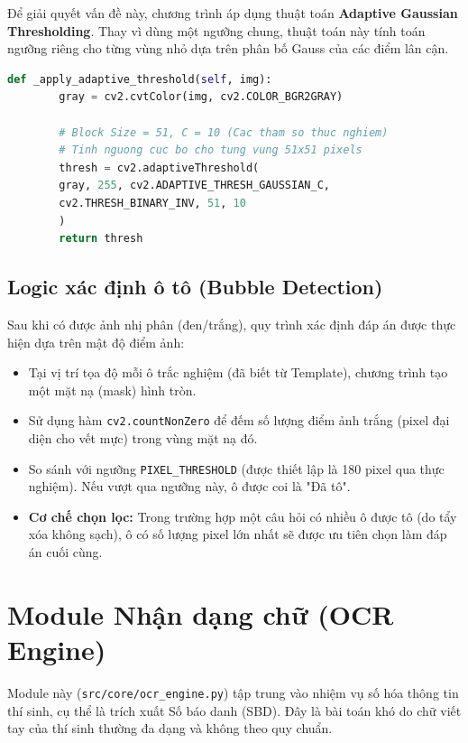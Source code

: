 \documentclass[6pt, a4paper]{report}
\begin{document}
	Để giải quyết vấn đề này, chương trình áp dụng thuật toán \textbf{Adaptive Gaussian Thresholding}. Thay vì dùng một ngưỡng chung, thuật toán này tính toán ngưỡng riêng cho từng vùng nhỏ dựa trên phân bố Gauss của các điểm lân cận.
	
	\begin{lstlisting}[language=Python, caption={Cài đặt thuật toán Adaptive Thresholding}]
		def _apply_adaptive_threshold(self, img):
		gray = cv2.cvtColor(img, cv2.COLOR_BGR2GRAY)
		
		# Block Size = 51, C = 10 (Cac tham so thuc nghiem)
		# Tinh nguong cuc bo cho tung vung 51x51 pixels
		thresh = cv2.adaptiveThreshold(
		gray, 255, cv2.ADAPTIVE_THRESH_GAUSSIAN_C,
		cv2.THRESH_BINARY_INV, 51, 10
		)
		return thresh
	\end{lstlisting}
	
	\subsection{Logic xác định ô tô (Bubble Detection)}
	Sau khi có được ảnh nhị phân (đen/trắng), quy trình xác định đáp án được thực hiện dựa trên mật độ điểm ảnh:
	\begin{itemize}
		\item Tại vị trí tọa độ mỗi ô trắc nghiệm (đã biết từ Template), chương trình tạo một mặt nạ (mask) hình tròn.
		\item Sử dụng hàm \texttt{cv2.countNonZero} để đếm số lượng điểm ảnh trắng (pixel đại diện cho vết mực) trong vùng mặt nạ đó.
		\item So sánh với ngưỡng \texttt{PIXEL\_THRESHOLD} (được thiết lập là 180 pixel qua thực nghiệm). Nếu vượt qua ngưỡng này, ô được coi là "Đã tô".
		\item \textbf{Cơ chế chọn lọc:} Trong trường hợp một câu hỏi có nhiều ô được tô (do tẩy xóa không sạch), ô có số lượng pixel lớn nhất sẽ được ưu tiên chọn làm đáp án cuối cùng.
	\end{itemize}
	
	\section{Module Nhận dạng chữ (OCR Engine)}
	
	Module này (\texttt{src/core/ocr\_engine.py}) tập trung vào nhiệm vụ số hóa thông tin thí sinh, cụ thể là trích xuất Số báo danh (SBD). Đây là bài toán khó do chữ viết tay của thí sinh thường đa dạng và không theo quy chuẩn.
	
\end{document}
